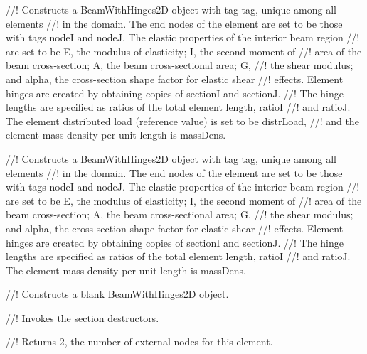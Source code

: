 //! Constructs a BeamWithHinges2D object with tag \p tag, unique among all elements
//! in the domain.  The end nodes of the element are set to be those with tags 
\p nodeI and \p nodeJ.  The elastic properties of the interior beam region
//! are set to be \p E, the modulus of elasticity; \p I, the second moment of
//! area of the beam cross-section; \p A, the beam cross-sectional area; \p G,
//! the shear modulus; and \p alpha, the cross-section shape factor for elastic shear 
//! effects.  Element hinges are created by obtaining copies of \p sectionI and \p sectionJ.
//! The hinge lengths are specified as ratios of the total element length, \p ratioI
//! and \p ratioJ.  The element distributed load (reference value) is set to be \p distrLoad,
//! and the element mass density per unit length is \p massDens.

//! Constructs a BeamWithHinges2D object with tag \p tag, unique among all elements
//! in the domain.  The end nodes of the element are set to be those with tags 
\p nodeI and \p nodeJ.  The elastic properties of the interior beam region
//! are set to be \p E, the modulus of elasticity; \p I, the second moment of
//! area of the beam cross-section; \p A, the beam cross-sectional area; \p G,
//! the shear modulus; and \p alpha, the cross-section shape factor for elastic shear 
//! effects.  Element hinges are created by obtaining copies of \p sectionI and \p sectionJ.
//! The hinge lengths are specified as ratios of the total element length, \p ratioI
//! and \p ratioJ.  The element mass density per unit length is \p massDens.

//! Constructs a blank BeamWithHinges2D object.

//! Invokes the section destructors.

//! Returns 2, the number of external nodes for this element.

